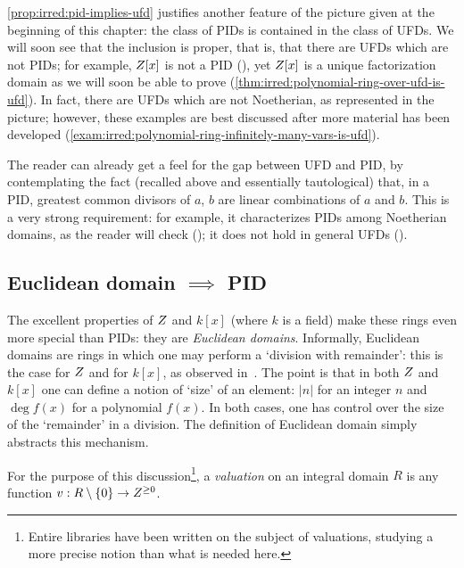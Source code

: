 \cref{prop:irred:pid-implies-ufd} justifies another feature of the picture given
at the beginning of this chapter: the class of PIDs is contained in
the class of UFDs. We will soon see that the inclusion is proper, that
is, that there are UFDs which are not PIDs; for example, $Z[x]$ is
not a PID (), yet $Z[x]$ is a
unique factorization domain as we will soon be able to prove
(\cref{thm:irred:polynomial-ring-over-ufd-is-ufd}). In fact, there are UFDs which are not
Noetherian, as represented in the picture; however, these examples are
best discussed after more material has been developed
(\cref{exam:irred:polynomial-ring-infinitely-many-vars-is-ufd}).

The reader can already get a feel for the gap between UFD and PID, by
contemplating the fact (recalled above and essentially tautological)
that, in a PID, greatest common divisors of $a$, $b$ are linear
combinations of $a$ and $b$. This is a very strong requirement: for
example, it characterizes PIDs among Noetherian domains, as the reader
will check (); it does
not hold in general UFDs ().

\subsection{\texorpdfstring{Euclidean domain $\implies$ PID}{Euclidean
    domain implies PID}}
\label{subsec:irred:euclidean-domain-implies-pid}
The excellent properties of $Z$ and $k[x]$ (where $k$ is a field)
make these rings even more special than PIDs: they are \emph{Euclidean
  domains}. Informally, Euclidean domains are rings in which one may
perform a `division with remainder': this is the case for $Z$ and for
$k[x]$, as observed
in~. The
point is that in both $Z$ and $k[x]$ one can define a notion of
`size' of an element: $|n|$ for an integer $n$ and $\deg f(x)$ for a
polynomial $f(x)$. In both cases, one has control over the size of the
`remainder' in a division. The definition of Euclidean domain simply
abstracts this mechanism.

For the purpose of this discussion\footnote{Entire libraries have been
  written on the subject of valuations, studying a more precise notion
  than what is needed here.}, a \emph{valuation} on an integral domain
$R$ is any function $v : R \mathbin{\backslash} \{0\} \to Z^{\geq 0}$.

